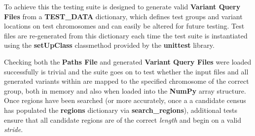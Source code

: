 To achieve this the testing suite is designed to generate valid
\textbf{Variant Query Files} from a \textbf{TEST\_DATA} dictionary, which
defines test groups and variant locations on test chromosomes and can easily be
altered for future testing. Test files are re-generated from this dictionary
each time the test suite is instantiated using the \textbf{setUpClass}
classmethod provided by the \textbf{unittest} library.

Checking both the \textbf{Paths File} and generated \textbf{Variant Query Files}
were loaded successfully is trivial and the suite goes on to test whether the
input files and all generated variants within are mapped to the specified
chromosome of the correct group, both in memory and also when loaded into the
\textbf{NumPy} array structure. Once regions have been searched (or more
accurately, once a a candidate census has populated the \textbf{regions}
dictionary via \textbf{search\_regions}), additional tests ensure that all
candidate regions are of the correct \textit{length} and begin on a valid
\textit{stride}.

